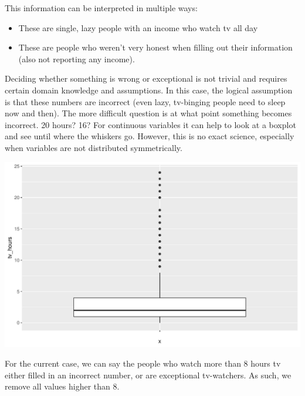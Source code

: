 \documentclass[]{tufte-book}
\newenvironment{Shaded}{}{}
\newcommand{\KeywordTok}[1]{\textcolor[rgb]{0.00,0.44,0.13}{\textbf{#1}}}
\newcommand{\StringTok}[1]{\textcolor[rgb]{0.25,0.44,0.63}{#1}}
\newcommand{\OperatorTok}[1]{\textcolor[rgb]{0.40,0.40,0.40}{#1}}
\newcommand{\NormalTok}[1]{#1}
\providecommand{\tightlist}{%
  \setlength{\itemsep}{0pt}\setlength{\parskip}{0pt}}
\begin{document}
This information can be interpreted in multiple ways:

\begin{itemize}
\tightlist
\item
  These are single, lazy people with an income who watch tv all day
\item
  These are people who weren't very honest when filling out their
  information (also not reporting any income).
\end{itemize}

Deciding whether something is wrong or exceptional is not trivial and
requires certain domain knowledge and assumptions. In this case, the
logical assumption is that these numbers are incorrect (even lazy,
tv-binging people need to sleep now and then). The more difficult
question is at what point something becomes incorrect. 20 hours? 16? For
continuous variables it can help to look at a boxplot and see until
where the whiskers go. However, this is no exact science, especially
when variables are not distributed symmetrically.

\begin{Shaded}
\end{Shaded}

\includegraphics{cleaning_tutorial_files/figure-latex/unnamed-chunk-39-1}

For the current case, we can say the people who watch more than 8 hours
tv either filled in an incorrect number, or are exceptional tv-watchers.
As such, we remove all values higher than 8.
\end{document}
